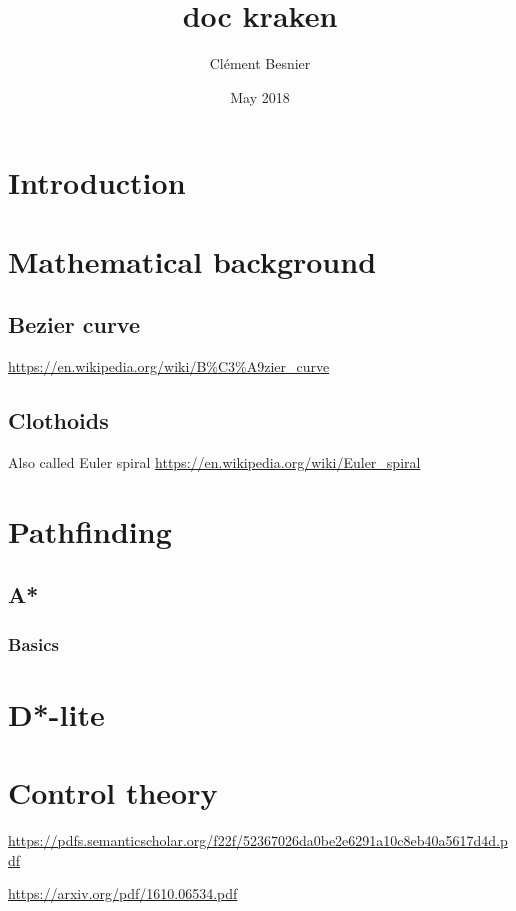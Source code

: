 \documentclass[11pt]{article}
\title{doc kraken}
\author{Clément Besnier}
\date{May 2018}
\begin{document}
    \maketitle

    \section{Introduction}\label{sec:introduction}

    \section{Mathematical background}\label{sec:mathematicalBackground}
    \subsection{Bezier curve}\label{subsec:bezierCurve}
    \href{https://en.wikipedia.org/wiki/B\%C3\%A9zier\_curve}{https://en.wikipedia.org/wiki/B\%C3\%A9zier\_curve}

    \subsection{Clothoids}\label{subsec:clothoids}
    Also called Euler spiral \href{https://en.wikipedia.org/wiki/Euler\_spiral}{https://en.wikipedia.org/wiki/Euler\_spiral}

    \section{Pathfinding}\label{sec:pathfinding}

    \subsection{A*}\label{subsec:a*}
    \subsubsection{Basics}

    \section{D*-lite}\label{sec:d*-lite}

    \section{Control theory}\label{sec:controlTheory}

    \href{https://pdfs.semanticscholar.org/f22f/52367026da0be2e6291a10c8eb40a5617d4d.pdf}{https://pdfs.semanticscholar.org/f22f/52367026da0be2e6291a10c8eb40a5617d4d.pdf}

    \href{https://arxiv.org/pdf/1610.06534.pdf}{https://arxiv.org/pdf/1610.06534.pdf}
\end{document}
